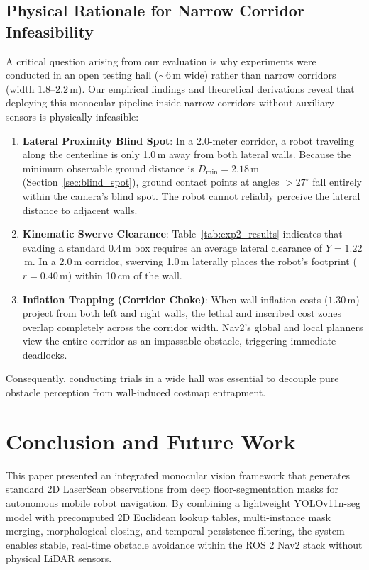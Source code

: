 \documentclass[preprint,12pt]{elsarticle}
\begin{document}
\subsection{Physical Rationale for Narrow Corridor Infeasibility}
\label{subsec:corridor_limitations}
A critical question arising from our evaluation is why experiments were conducted in an open testing hall ($\sim 6$\,m wide) rather than narrow corridors (width $1.8\text{--}2.2$\,m). Our empirical findings and theoretical derivations reveal that deploying this monocular pipeline inside narrow corridors without auxiliary sensors is physically infeasible:

\begin{enumerate}
  \item \textbf{Lateral Proximity Blind Spot}: In a 2.0-meter corridor, a robot traveling along the centerline is only 1.0\,m away from both lateral walls. Because the minimum observable ground distance is $D_{\min} = 2.18$\,m (Section~\ref{sec:blind_spot}), ground contact points at angles $> 27^\circ$ fall entirely within the camera's blind spot. The robot cannot reliably perceive the lateral distance to adjacent walls.
  \item \textbf{Kinematic Swerve Clearance}: Table~\ref{tab:exp2_results} indicates that evading a standard $0.4$\,m box requires an average lateral clearance of $Y = 1.22$\,m. In a 2.0\,m corridor, swerving 1.0\,m laterally places the robot's footprint ($r=0.40$\,m) within 10\,cm of the wall.
  \item \textbf{Inflation Trapping (Corridor Choke)}: When wall inflation costs ($1.30$\,m) project from both left and right walls, the lethal and inscribed cost zones overlap completely across the corridor width. Nav2's global and local planners view the entire corridor as an impassable obstacle, triggering immediate deadlocks.
\end{enumerate}
Consequently, conducting trials in a wide hall was essential to decouple pure obstacle perception from wall-induced costmap entrapment.

\section{Conclusion and Future Work}
\label{sec:conclusion}

This paper presented an integrated monocular vision framework that generates standard 2D LaserScan observations from deep floor-segmentation masks for autonomous mobile robot navigation. By combining a lightweight YOLOv11n-seg model with precomputed 2D Euclidean lookup tables, multi-instance mask merging, morphological closing, and temporal persistence filtering, the system enables stable, real-time obstacle avoidance within the ROS 2 Nav2 stack without physical LiDAR sensors. 
\end{document}
